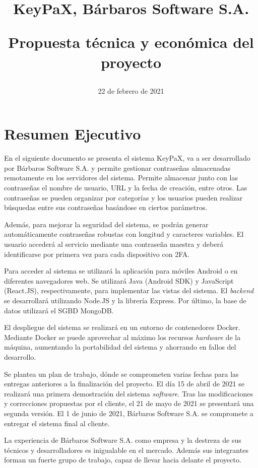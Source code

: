 \documentclass{article}
\title{
\Huge{KeyPaX, Bárbaros Software S.A.} \\ 
\begin{Large} 
Propuesta técnica y económica del proyecto
\end{Large}}
\author{}
\date{22 de febrero de 2021}
\begin{document}
\maketitle

\pagebreak

\section{Resumen Ejecutivo}

En el siguiente documento se presenta el sistema KeyPaX, va a ser desarrollado por Bárbaros Software S.A. y permite gestionar contraseñas almacenadas remotamente en los servidores del sistema. Permite almacenar junto con las contraseñas el nombre de usuario, URL y la fecha de creación, entre otros. Las contraseñas se pueden organizar por categorías y los usuarios pueden realizar búsquedas entre sus contraseñas basándose en ciertos parámetros.

Además, para mejorar la seguridad del sistema, se podrán generar automáticamente contraseñas robustas con longitud y caracteres variables. El usuario accederá al servicio mediante una contraseña maestra y deberá identificarse por primera vez para cada dispositivo con 2FA.

Para acceder al sistema se utilizará la aplicación para móviles Android o en diferentes navegadores web. Se utilizará Java (Android SDK) y JavaScript (React.JS), respectivamente, para implementar las vistas del sistema. El \textit{backend} se desarrollará utilizando Node.JS y la librería Express. Por último, la base de datos utilizará el SGBD MongoDB. 

El despliegue del sistema se realizará en un entorno de contenedores Docker. Mediante Docker se puede aprovechar al máximo los recursos \textit{hardware} de la máquina, aumentando la portabilidad del sistema y ahorrando en fallos del desarrollo. 

Se plantea un plan de trabajo, dónde se comprometen varias fechas para las entregas anteriores a la finalización del proyecto.  El día 15 de abril de 2021 se realizará una primera demostración del sistema \textit{software}. Tras las modificaciones y correcciones propuestas por el cliente, el 21 de mayo de 2021 se presentará una segunda versión. El 1 de junio de 2021, Bárbaros Software S.A. se compromete a entregar el sistema final al cliente.

La experiencia de Bárbaros Software S.A. como empresa y la destreza de sus técnicos y desarrolladores es inigualable en el mercado. Además sus integrantes forman un fuerte grupo de trabajo, capaz de llevar hacia delante el proyecto.
\end{document}
